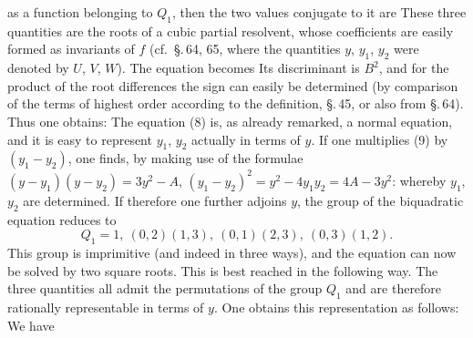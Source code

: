 as a function belonging to $Q_1$, then the two values conjugate to it are
These three quantities are the roots of a cubic partial resolvent, whose coefficients are easily formed as invariants of $f$ (cf.\ \S.\,64, 65, where the quantities $y$, $y_1$, $y_2$ were denoted by $U$, $V$, $W$). The equation becomes
Its discriminant is $B^2$, and for the product of the root differences the sign can easily be determined (by comparison of the terms of highest order according to the  definition, \S.\,45, or also from \S.\,64). Thus one obtains:
The equation (8) is, as already remarked, a normal equation, and it is easy to represent $y_1$, $y_2$ actually in terms of $y$. If one multiplies (9) by $(y_1-y_2)$, one finds, by making use of the formulae $(y-y_1)(y-y_2) = 3y^2 - A$, $(y_1-y_2)^2 = y^2 - 4y_1y_2 = 4A - 3y^2$:
whereby $y_1$, $y_2$ are determined. If therefore one further adjoins $y$, the group of the biquadratic equation reduces to
\[
Q_1 = 1, \ (0,2)(1,3), \ (0,1)(2,3), \ (0,3)(1,2).
\]
This group is imprimitive (and indeed in three ways), and the equation can now be solved by two square roots. This is best reached in the following way. The three quantities
all admit the permutations of the group $Q_1$ and are therefore rationally representable in terms of $y$. One obtains this representation as follows: We have
